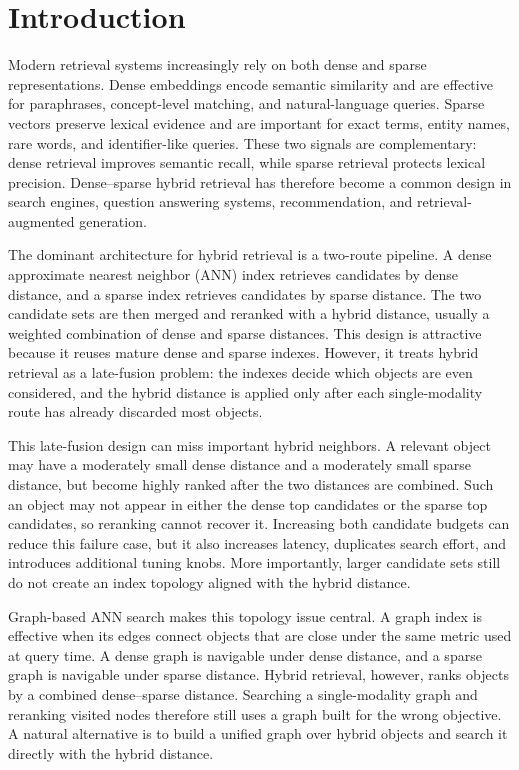 \section{Introduction}
\label{sec:introduction}

Modern retrieval systems increasingly rely on both dense and sparse representations. Dense embeddings encode semantic similarity and are effective for paraphrases, concept-level matching, and natural-language queries. Sparse vectors preserve lexical evidence and are important for exact terms, entity names, rare words, and identifier-like queries. These two signals are complementary: dense retrieval improves semantic recall, while sparse retrieval protects lexical precision. Dense--sparse hybrid retrieval has therefore become a common design in search engines, question answering systems, recommendation, and retrieval-augmented generation.

The dominant architecture for hybrid retrieval is a two-route pipeline. A dense approximate nearest neighbor (ANN) index retrieves candidates by dense distance, and a sparse index retrieves candidates by sparse distance. The two candidate sets are then merged and reranked with a hybrid distance, usually a weighted combination of dense and sparse distances. This design is attractive because it reuses mature dense and sparse indexes. However, it treats hybrid retrieval as a late-fusion problem: the indexes decide which objects are even considered, and the hybrid distance is applied only after each single-modality route has already discarded most objects.

This late-fusion design can miss important hybrid neighbors. A relevant object may have a moderately small dense distance and a moderately small sparse distance, but become highly ranked after the two distances are combined. Such an object may not appear in either the dense top candidates or the sparse top candidates, so reranking cannot recover it. Increasing both candidate budgets can reduce this failure case, but it also increases latency, duplicates search effort, and introduces additional tuning knobs. More importantly, larger candidate sets still do not create an index topology aligned with the hybrid distance.

Graph-based ANN search makes this topology issue central. A graph index is effective when its edges connect objects that are close under the same metric used at query time. A dense graph is navigable under dense distance, and a sparse graph is navigable under sparse distance. Hybrid retrieval, however, ranks objects by a combined dense--sparse distance. Searching a single-modality graph and reranking visited nodes therefore still uses a graph built for the wrong objective. A natural alternative is to build a unified graph over hybrid objects and search it directly with the hybrid distance.

